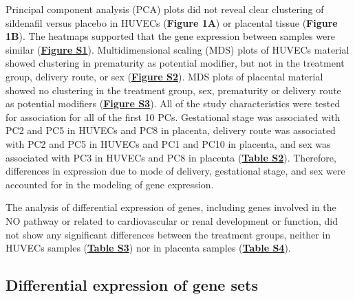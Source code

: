 \documentclass[authordate, empirical]{jote-new-article}
\begin{document}
Principal component analysis (PCA) plots did not reveal clear clustering of sildenafil versus placebo in HUVECs (\textbf{Figure 1A}) or placental tissue (\textbf{Figure 1B}). The heatmaps supported that the gene expression between samples were similar (\textbf{\href{https://journal.trialanderror.org/pub/prenatal-sildenafil-pregnancies\#supplementary-materials}{Figure S1}}). Multidimensional scaling (MDS) plots of HUVECs material showed clustering in prematurity as potential modifier, but not in the treatment group, delivery route, or sex (\textbf{\href{https://journal.trialanderror.org/pub/prenatal-sildenafil-pregnancies\#supplementary-materials}{Figure S2}}). MDS plots of placental material showed no clustering in the treatment group, sex, prematurity or delivery route as potential modifiers (\textbf{\href{https://journal.trialanderror.org/pub/prenatal-sildenafil-pregnancies\#supplementary-materials}{Figure S3}}). All of the study characteristics were tested for association for all of the first 10 PCs. Gestational stage was associated with PC2 and PC5 in HUVECs and PC8 in placenta, delivery route was associated with PC2 and PC5 in HUVECs and PC1 and PC10 in placenta, and sex was associated with PC3 in HUVECs and PC8 in placenta (\textbf{\href{https://journal.trialanderror.org/pub/prenatal-sildenafil-pregnancies\#supplementary-materials}{Table S2}}). Therefore, differences in expression due to mode of delivery, gestational stage, and sex were accounted for in the modeling of gene expression.



The analysis of differential expression of genes, including genes involved in the NO pathway or related to cardiovascular or renal development or function, did not show any significant differences between the treatment groups, neither in HUVECs samples (\textbf{\href{https://journal.trialanderror.org/pub/prenatal-sildenafil-pregnancies\#supplementary-materials}{Table S3}}) nor in placenta samples (\textbf{\href{https://journal.trialanderror.org/pub/prenatal-sildenafil-pregnancies\#supplementary-materials}{Table S4}}).


\subsection{Differential expression of gene sets}
\end{document}
